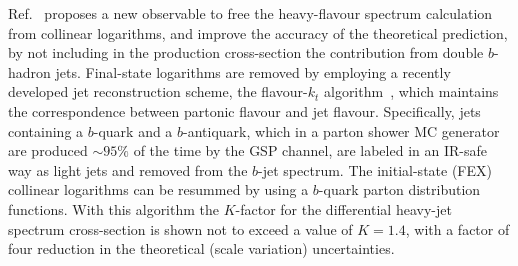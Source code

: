 
Ref.~\cite{Salam.AccurateHQ} proposes a new observable to free the heavy-flavour spectrum calculation from collinear logarithms, and improve the accuracy of the theoretical prediction,
by not including in the production cross-section the contribution from double $b$-hadron jets. Final-state logarithms are removed by employing a recently developed jet reconstruction scheme, the flavour-$k_t$ algorithm~\cite{flavorkt}, which maintains the correspondence between partonic flavour and jet flavour. Specifically, jets containing a $b$-quark and a $b$-antiquark, which in a parton shower MC generator are produced $\sim95\%$ of the time by the GSP channel, are labeled in an IR-safe way as light jets and removed from the $b$-jet spectrum.
The initial-state (FEX) collinear logarithms can be resummed by using a $b$-quark parton distribution functions.
With this algorithm the $K$-factor for the differential heavy-jet spectrum cross-section is shown not to exceed a value of $K=1.4$, with a factor of four reduction in the theoretical (scale variation) uncertainties.
%
